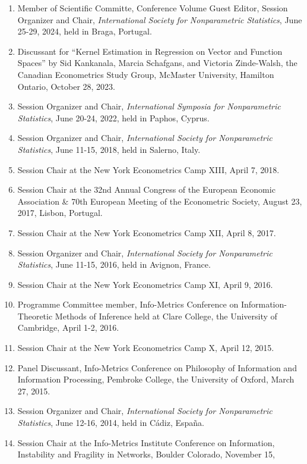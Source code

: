 \documentclass[
]{article}
\begin{document}
\begin{enumerate}
\def\labelenumi{\arabic{enumi}.}
\item
  Member of Scientific Committe, Conference Volume Guest Editor, Session
  Organizer and Chair, \emph{International Society for Nonparametric
  Statistics}, June 25-29, 2024, held in Braga, Portugal.
\item
  Discussant for ``Kernel Estimation in Regression on Vector and
  Function Spaces'' by Sid Kankanala, Marcia Schafgans, and Victoria
  Zinde-Walsh, the Canadian Econometrics Study Group, McMaster
  University, Hamilton Ontario, October 28, 2023.
\item
  Session Organizer and Chair, \emph{International Symposia for
  Nonparametric Statistics}, June 20-24, 2022, held in Paphos, Cyprus.
\item
  Session Organizer and Chair, \emph{International Society for
  Nonparametric Statistics}, June 11-15, 2018, held in Salerno, Italy.
\item
  Session Chair at the New York Econometrics Camp XIII, April 7, 2018.
\item
  Session Chair at the 32nd Annual Congress of the European Economic
  Association \& 70th European Meeting of the Econometric Society,
  August 23, 2017, Lisbon, Portugal.
\item
  Session Chair at the New York Econometrics Camp XII, April 8, 2017.
\item
  Session Organizer and Chair, \emph{International Society for
  Nonparametric Statistics}, June 11-15, 2016, held in Avignon, France.
\item
  Session Chair at the New York Econometrics Camp XI, April 9, 2016.
\item
  Programme Committee member, Info-Metrics Conference on
  Information-Theoretic Methods of Inference held at Clare College, the
  University of Cambridge, April 1-2, 2016.
\item
  Session Chair at the New York Econometrics Camp X, April 12, 2015.
\item
  Panel Discussant, Info-Metrics Conference on Philosophy of Information
  and Information Processing, Pembroke College, the University of
  Oxford, March 27, 2015.
\item
  Session Organizer and Chair, \emph{International Society for
  Nonparametric Statistics}, June 12-16, 2014, held in Cádiz, España.
\item
  Session Chair at the Info-Metrics Institute Conference on Information,
  Instability and Fragility in Networks, Boulder Colorado, November 15,

\end{enumerate}
\end{document}
